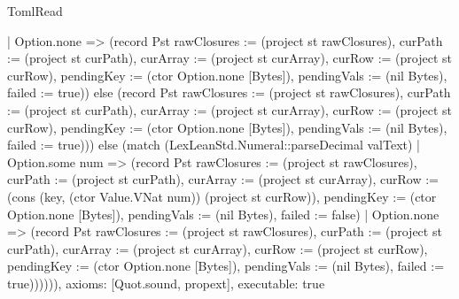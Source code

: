\begin{lexlean}{TomlRead}
\begin{semanticmodule}
{           | Option.none => (record Pst {rawClosures := (project st rawClosures), curPath := (project st curPath), curArray := (project st curArray), curRow := (project st curRow), pendingKey := (ctor Option.none [Bytes]), pendingVals := (nil Bytes), failed := true}))
        else (record Pst {rawClosures := (project st rawClosures), curPath := (project st curPath), curArray := (project st curArray), curRow := (project st curRow), pendingKey := (ctor Option.none [Bytes]), pendingVals := (nil Bytes), failed := true})))
    else (match (LexLeanStd.Numeral::parseDecimal valText)
      | Option.some num => (record Pst {rawClosures := (project st rawClosures), curPath := (project st curPath), curArray := (project st curArray), curRow := (cons (key, (ctor Value.VNat num)) (project st curRow)), pendingKey := (ctor Option.none [Bytes]), pendingVals := (nil Bytes), failed := false})
      | Option.none => (record Pst {rawClosures := (project st rawClosures), curPath := (project st curPath), curArray := (project st curArray), curRow := (project st curRow), pendingKey := (ctor Option.none [Bytes]), pendingVals := (nil Bytes), failed := true})))))),
  axioms: [Quot.sound, propext],
  executable: true
}


\end{semanticmodule}
\end{lexlean}
